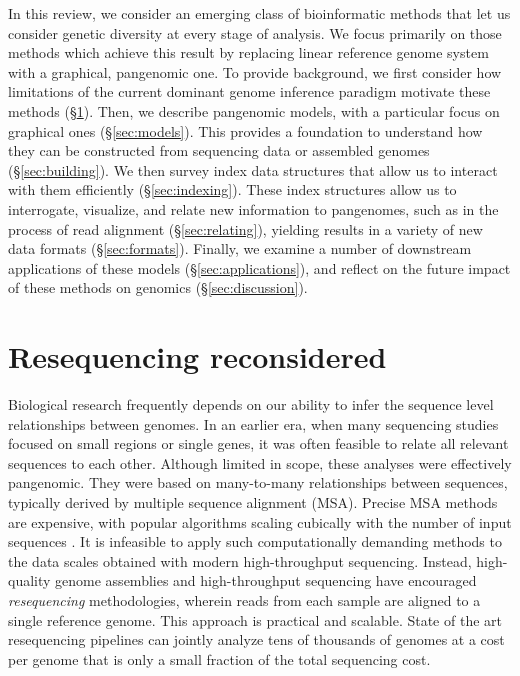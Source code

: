 In this review, we consider an emerging class of bioinformatic methods that let us consider genetic diversity at every stage of analysis.
We focus primarily on those methods which achieve this result by replacing linear reference genome system with a graphical, pangenomic one.
To provide background, we first consider how limitations of the current dominant genome inference paradigm motivate these methods (\S \ref{sec:resequencing}).
Then, we describe pangenomic models, with a particular focus on graphical ones (\S \ref{sec:models}).
This provides a foundation to understand how they can be constructed from sequencing data or assembled genomes (\S \ref{sec:building}).
We then survey index data structures that allow us to interact with them efficiently (\S \ref{sec:indexing}).
These index structures allow us to interrogate, visualize, and relate new information to pangenomes, such as in the process of read alignment (\S \ref{sec:relating}), yielding results in a variety of new data formats (\S \ref{sec:formats}).
Finally, we examine a number of downstream applications of these models (\S \ref{sec:applications}), and reflect on the future impact of these methods on genomics (\S \ref{sec:discussion}).

\section{Resequencing reconsidered}
\label{sec:resequencing}

Biological research frequently depends on our ability to infer the sequence level relationships between genomes.
In an earlier era, when many sequencing studies focused on small regions or single genes, it was often feasible to relate all relevant sequences to each other.
Although limited in scope, these analyses were effectively pangenomic.
They were based on many-to-many relationships between sequences, typically derived by multiple sequence alignment (MSA).
Precise MSA methods are expensive, with popular algorithms scaling cubically with the number of input sequences \cite{notredame2000t}.
It is infeasible to apply such computationally demanding methods to the data scales obtained with modern high-throughput sequencing.
Instead, high-quality genome assemblies and high-throughput sequencing have encouraged \emph{resequencing} methodologies, wherein reads from each sample are aligned to a single reference genome. %
This approach is practical and scalable.
State of the art resequencing pipelines can jointly analyze tens of thousands of genomes \cite{Poplin_2017} at a cost per genome that is only a small fraction of the total sequencing cost.

